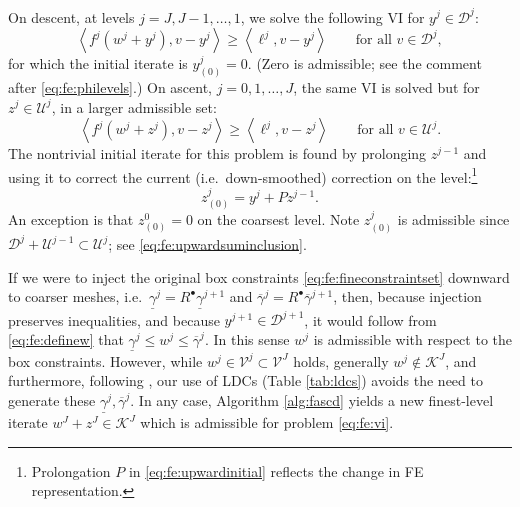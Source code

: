 \documentclass[letterpaper,final,12pt,reqno]{amsart}
\theoremstyle{cstyle}
\theoremstyle{cstyle*}
\theoremstyle{dstyle}
\numberwithin{equation}{section}
\numberwithin{figure}{section}
\numberwithin{table}{section}
\numberwithin{theorem}{section}
\newcommand{\cK}{\mathcal{K}}
\newcommand{\cV}{\mathcal{V}}
\newcommand{\ip}[2]{\left<#1,#2\right>}
\newcommand{\iR}{R^{\bullet}}
\begin{document}
On descent, at levels $j=J,J-1,\dots,1$, we solve the following VI for $y^j \in \mathcal{D}^j$:
\begin{equation}
\ip{f^j(w^j + y^j)}{v-y^j} \ge \ip{\ell^j}{v-y^j} \qquad \text{for all } v\in \mathcal{D}^j, \label{eq:fe:downvi}
\end{equation}
for which the initial iterate is $y_{(0)}^j=0$.  (Zero is admissible; see the comment after \eqref{eq:fe:philevels}.)  On ascent, $j=0,1,\dots,J$, the same VI is solved but for $z^j \in \mathcal{U}^j$, in a larger admissible set:
\begin{equation}
\ip{f^j(w^j + z^j)}{v-z^j} \ge \ip{\ell^j}{v-z^j} \qquad \text{for all } v\in \mathcal{U}^j. \label{eq:fe:upvi}
\end{equation}
The nontrivial initial iterate for this problem is found by prolonging $z^{j-1}$ and using it to correct the current (i.e.~down-smoothed) correction on the level:\footnote{Prolongation $P$ in \eqref{eq:fe:upwardinitial} reflects the change in FE representation.}
\begin{equation}
z_{(0)}^j = y^j + P z^{j-1}.  \label{eq:fe:upwardinitial}
\end{equation}
An exception is that $z_{(0)}^0=0$ on the coarsest level.  Note $z_{(0)}^j$ is admissible since $\mathcal{D}^j + \mathcal{U}^{j-1} \subset \mathcal{U}^j$; see \eqref{eq:fe:upwardsuminclusion}.

If we were to inject the original box constraints \eqref{eq:fe:fineconstraintset} downward to coarser meshes, i.e.~$\underline{\gamma}^j = \iR \underline{\gamma}^{j+1}$ and $\overline{\gamma}^j = \iR \overline{\gamma}^{j+1}$, then, because injection preserves inequalities, and because $y^{j+1} \in \mathcal{D}^{j+1}$, it would follow from \eqref{eq:fe:definew} that $\underline{\gamma}^j \le w^j \le \overline{\gamma}^j$.  In this sense $w^j$ is admissible with respect to the box constraints.  However, while $w^j \in \cV^j \subset \cV^J$ holds, generally $w^j \notin \cK^J$, and furthermore, following \cite{GraeserKornhuber2009}, our use of LDCs (Table \ref{tab:ldcs}) avoids the need to generate these $\underline{\gamma}^j, \overline{\gamma}^j$.  In any case, Algorithm \ref{alg:fascd} yields a new finest-level iterate $w^J+z^J \in \cK^J$ which is  admissible for problem \eqref{eq:fe:vi}.
\end{document}
